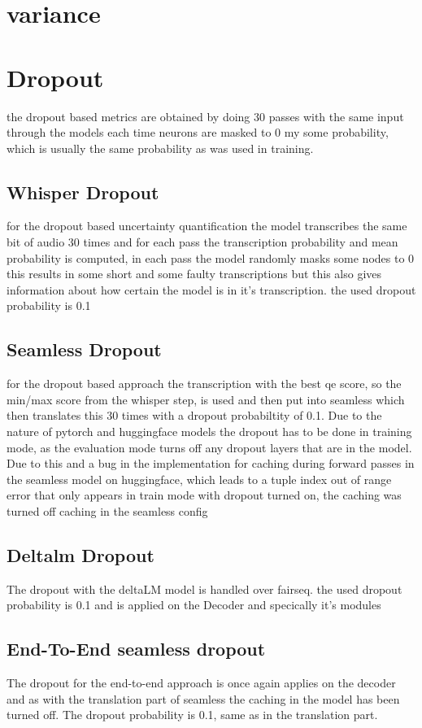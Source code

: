 \section{variance}


\section{Dropout}
the dropout based metrics are obtained by doing 30 passes with the same input through the models each time neurons are masked to 0 my some probability, which is usually the same probability as was used in training. 

\subsection{Whisper Dropout}
for the dropout based uncertainty quantification the model transcribes the same bit of audio 30 times and for each pass the transcription probability and mean probability is computed, in each pass the model randomly masks some nodes to 0
this results in some short and some faulty transcriptions but this also gives information about how certain the model is in it's transcription. the used dropout probability is 0.1 


\subsection{Seamless Dropout}
for the dropout based approach the transcription with the best qe score, so the min/max score from the whisper step, is used 
and then put into seamless which then translates this 30 times with a dropout probabiltity of 0.1.
Due to the nature of pytorch and huggingface models the dropout has to be done in training mode, as the evaluation mode turns off any dropout layers that are in the model. Due to this and a bug in the implementation for caching during forward passes in the seamless model on huggingface, which leads to a tuple index out of range error that only appears in train mode with dropout turned on, the caching was turned off caching in the seamless config

\subsection{Deltalm Dropout}
The dropout with the deltaLM model is handled over fairseq. 
the used dropout probability is 0.1 and is applied on the Decoder and specically it's modules



\subsection{End-To-End seamless dropout}
The dropout for the end-to-end approach is once again applies on the decoder and as with the translation part of seamless the caching in the model has been turned off. The dropout probability is 0.1, same as in the translation part.



